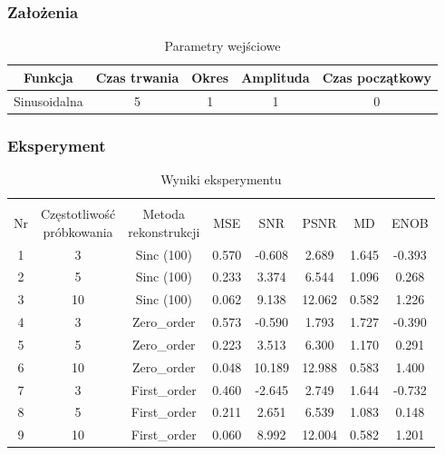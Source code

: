 \documentclass{article}
\begin{document}
    \subsubsection{Założenia}
    \begin{table}[h!]
        \centering
        \begin{tabular}{|c|c|c|c|c|}
            \hline
            Funkcja & Czas trwania & Okres & Amplituda & Czas początkowy \\ \hline
            Sinusoidalna & 5 & 1 & 1 & 0   \\ \hline
        \end{tabular}
        \caption{Parametry wejściowe}
    \end{table}
    
    \subsubsection{Eksperyment}

    \begin{table}[h!]
        \centering
        \vspace{0.2cm}
        \begin{tabular}{|c|c|c|c|c|c|c|c|}
            \hline\hline\\[-0.4cm]
            Nr & \shortstack{Częstotliwość\\ próbkowania} & \shortstack{Metoda\\ rekonstrukcji} & MSE & SNR & PSNR & MD & ENOB  \\
            \hline
            1 & 3 & Sinc (100) & 0.570 & -0.608 & 2.689 & 1.645 & -0.393 \\
            \hline
            2 & 5 & Sinc (100) & 0.233 & 3.374 & 6.544 & 1.096 & 0.268   \\
            \hline
            3 & 10 & Sinc (100) & 0.062 & 9.138 & 12.062 & 0.582 & 1.226   \\
            \hline
            4 & 3 & Zero\_order & 0.573 & -0.590 & 1.793 & 1.727 & -0.390  \\
            \hline
            5 & 5 & Zero\_order & 0.223 & 3.513 & 6.300 & 1.170 & 0.291   \\
            \hline
            6 & 10 & Zero\_order & 0.048 & 10.189 & 12.988 & 0.583 & 1.400   \\
            \hline
            7 & 3 & First\_order & 0.460 & -2.645 & 2.749 & 1.644 & -0.732   \\
            \hline
            8 & 5 & First\_order & 0.211 & 2.651 & 6.539 & 1.083 & 0.148   \\
            \hline
            9 & 10 & First\_order & 0.060 & 8.992 & 12.004 & 0.582 & 1.201   \\
            \hline
        \end{tabular}
        \caption{Wyniki eksperymentu}
    \end{table}
    \FloatBarrier
\end{document}
